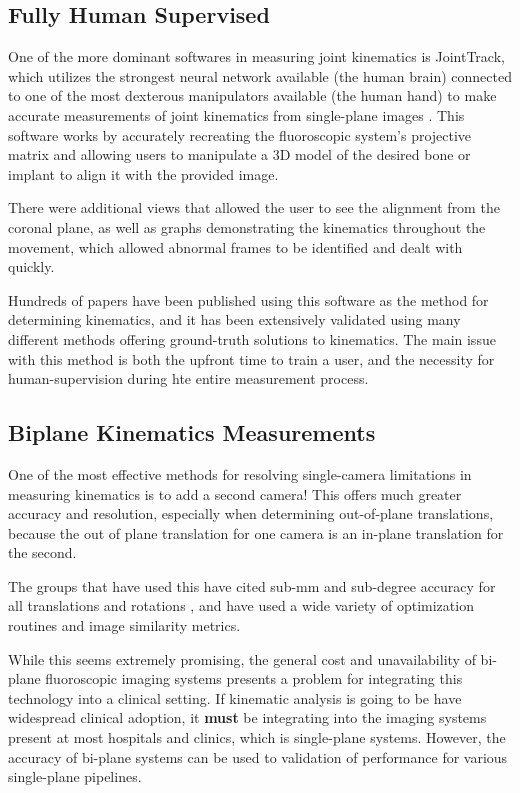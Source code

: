 \subsection{Fully Human Supervised}

One of the more dominant softwares in measuring joint kinematics is JointTrack, which utilizes the strongest neural network available (the human brain) connected to one of the most dexterous manipulators available (the human hand) to make accurate measurements of joint kinematics from single-plane images \cite{muJointTrackOpenSourceEasily2007}. This software works by accurately recreating the fluoroscopic system's projective matrix and allowing users to manipulate a 3D model of the desired bone or implant to align it with the provided image.

There were additional views that allowed the user to see the alignment from the coronal plane, as well as graphs demonstrating the kinematics throughout the movement, which allowed abnormal frames to be identified and dealt with quickly. 

Hundreds of papers have been published using this software as the method for determining kinematics, and it has been extensively validated using many different methods offering ground-truth solutions to kinematics. The main issue with this method is both the upfront time to train a user, and the necessity for human-supervision during hte entire measurement process. 

\subsection{Biplane Kinematics Measurements}

One of the most effective methods for resolving single-camera limitations in measuring kinematics is to add a second camera! This offers much greater accuracy and resolution, especially when determining out-of-plane translations, because the out of plane translation for one camera is an in-plane translation for the second.

The groups that have used this have cited sub-mm and sub-degree accuracy for all translations and rotations \cite{burtonAutomaticTrackingHealthy2021,youVivoMeasurement3D2001,bakaStatisticalShapeModelBased2012}, and have used a wide variety of optimization routines and image similarity metrics. 

While this seems extremely promising, the general cost and unavailability of bi-plane fluoroscopic imaging systems presents a problem for integrating this technology into a clinical setting. If kinematic analysis is going to be have widespread clinical adoption, it \textbf{must} be integrating into the imaging systems present at most hospitals and clinics, which is single-plane systems. However, the accuracy of bi-plane systems can be used to validation of performance for various single-plane pipelines.